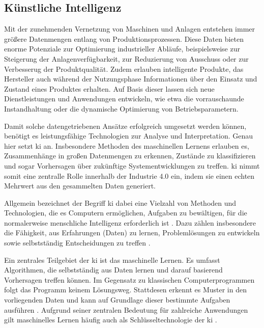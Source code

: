 \subsection{Künstliche Intelligenz}
Mit der zunehmenden Vernetzung von Maschinen und Anlagen entstehen immer größere Datenmengen entlang von Produktionsprozessen.
Diese Daten bieten enorme Potenziale zur Optimierung industrieller Abläufe, beispielsweise zur Steigerung der Anlagenverfügbarkeit, zur Reduzierung von Ausschuss oder zur Verbesserug der Produktqualität.
Zudem erlauben intelligente Produkte, das Hersteller auch während der Nutzungsphase Informationen über den Einsatz und Zustand eines Produktes erhalten.
Auf Basis dieser lassen sich neue Dienstleistungen und Anwendungen entwickeln, wie etwa die vorrauschaunde Instandhaltung oder die dynamische Optimierung von Betriebsparametern.

Damit solche datengetriebenen Ansätze erfolgreich umgesetzt werden können, benötigt es leistungsfähige Technologien zur Analyse und Interpretation.
Genau hier setzt \acs{ki} an.
Insbesondere Methoden des maschinellen Lernens erlauben es, Zusammenhänge in großen Datenmengen zu erkennen, Zustände zu klassifizieren und sogar Vorhersagen über zukünftige Systementwicklungen zu treffen. \cite{KIEinführung} 
\acs{ki} nimmt somit eine zentralle Rolle innerhalb der Industrie 4.0 ein, indem sie einen echten Mehrwert aus den gesammelten Daten generiert.

Allgemein bezeichnet der Begriff \acs{ki} dabei eine Vielzahl von Methoden und Technologien, die es Computern ermöglichen, Aufgaben zu bewältigen, für die normalerweise menschliche Intelligenz erforderlich ist \cite{KIDefinition1}.
Dazu zählen insbesondere die Fähigkeit, aus Erfahrungen (Daten) zu lernen, Problemlösungen zu entwickeln sowie selbstständig Entscheidungen zu treffen \cite{KIDefinition2}.

Ein zentrales Teilgebiet der \acs{ki} ist das maschinelle Lernen.
Es umfasst Algorithmen, die selbstständig aus Daten lernen und darauf basierend Vorhersagen treffen können.
Im Gegensatz zu klassischen Computerprogrammen folgt das Programm keinem Lösungsweg. 
Stattdesen erkennt es Muster in den vorliegenden Daten und kann auf Grundlage dieser bestimmte Aufgaben ausführen \cite{MLDefinition}.
Aufgrund seiner zentralen Bedeutung für zahlreiche Anwendungen gilt maschinelles Lernen häufig auch als Schlüsseltechnologie der \acs{ki} \cite{MLSchlüsseltechnologie}. 

